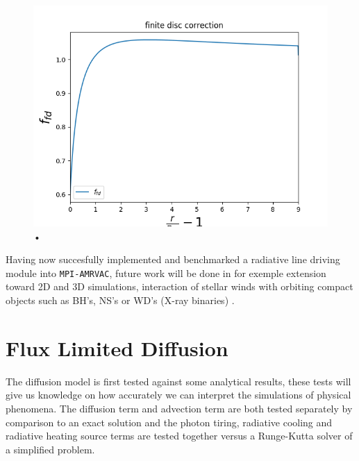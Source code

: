 \begin{figure}
\centering
\includegraphics[width = \textwidth]{CAK_fd_factor.png}
\caption{•}
\label{fig: fd_factor}
\end{figure}

Having now succesfully implemented and benchmarked a radiative line driving module into \texttt{MPI-AMRVAC}, future work will be done in for exemple extension toward 2D and 3D simulations,  interaction of stellar winds with orbiting compact objects such as BH's, NS's or WD's (X-ray binaries) \citep{Mellah2017}.


\section{Flux Limited Diffusion}
The diffusion model is first tested against some analytical results, these tests will give us knowledge on how accurately we can interpret the simulations of physical phenomena. The diffusion term and advection term are both tested separately by comparison to an exact solution and the photon tiring, radiative cooling and radiative heating source terms are tested together versus a Runge-Kutta solver of a simplified problem.

